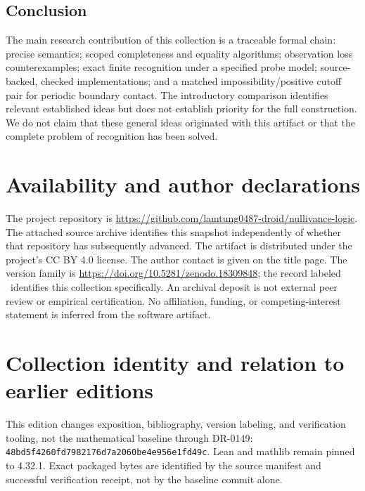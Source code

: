 \documentclass[11pt,a4paper]{article}
\begin{document}
\subsection{Conclusion}
The main research contribution of this collection is a traceable formal chain:
precise semantics; scoped completeness and equality algorithms; observation
loss counterexamples; exact finite recognition under a specified probe model;
source-backed, checked implementations; and a matched impossibility/positive
cutoff pair for periodic boundary contact. The introductory comparison identifies
relevant established ideas but does not establish priority for the full
construction. We do not claim that these general
ideas originated with this artifact or that the complete problem of
recognition has been solved.

\section*{Availability and author declarations}
The project repository is
\url{https://github.com/lamtung0487-droid/nullivance-logic}.
The attached source archive identifies this snapshot independently of whether
that repository has subsequently advanced. The artifact is distributed under
the project's CC BY 4.0 license. The author contact is given on the title page.
The version family is \url{https://doi.org/10.5281/zenodo.18309848};
the record labeled \PublicationVersion\ identifies this collection specifically.
An archival deposit is not external peer review or empirical certification.
No affiliation, funding, or competing-interest statement is inferred from
the software artifact.

\appendix
\section{Collection identity and relation to earlier editions}
This edition changes exposition, bibliography, version labeling, and verification
tooling, not the mathematical baseline through DR-0149:
\nolinkurl{48bd5f4260fd7982176d7a2060be4e956e1fd49c}.
Lean and mathlib remain pinned to 4.32.1. Exact packaged bytes are identified by
the source manifest and successful verification receipt, not by the baseline
commit alone.
\end{document}
